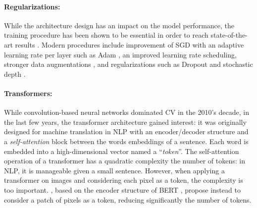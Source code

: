 \paragraph{Regularizations:} While the architecture design has an impact on the model performance,
the training procedure has been shown to be essential in order to reach state-of-the-art results
\citep{wightman2019resnetstrikesback}. Modern procedures include improvement of \ac{SGD} with an
adaptive learning rate per layer such as Adam \citep{kingma2014adam}, an improved learning rate
scheduling, stronger data augmentations
\citep{muller2021trivialaugment,hingyi2018mixup,zhong2017erasing}, and regularizations such as
Dropout \citep{gal2016dropout} and stochastic depth \citep{gao2016stochasticdepth}.

\paragraph{Transformers:} While convolution-based neural networks dominated \acf{CV} in the 2010's
decade, in the last few years, the transformer architecture gained interest: it was originally
designed for machine translation in \ac{NLP} \citep{vaswani2017transformer} with an encoder/decoder
structure and a \textit{self-attention} block between the words embeddings of a sentence. Each word is
embedded into a high-dimensional vector named a ``\textit{token}''. The self-attention operation of a
transformer has a quadratic complexity \wrt the number of tokens: in \ac{NLP}, it is manageable
given a small sentence. However, when applying a transformer on images and considering each pixel
as a token, the complexity is too important. \citet{dosovitskiy2020vit}, based on the encoder
structure of BERT \citep{devlin2018bert}, propose instead to consider a patch of pixels as a token,
reducing significantly the number of tokens.

